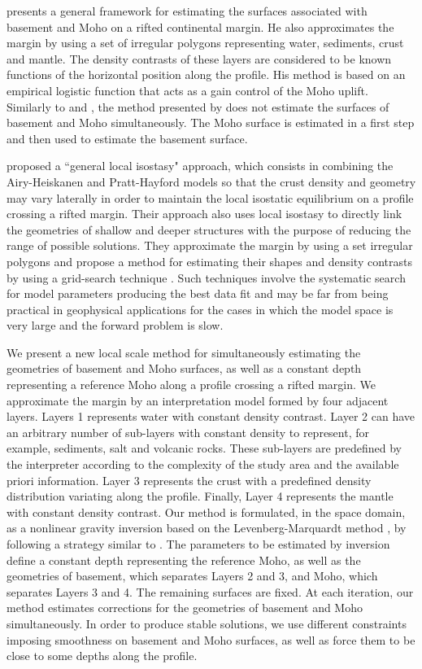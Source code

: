 \documentclass[manuscript]{geophysics}
\begin{document}
\citet{salem2017} presents a general framework for estimating the surfaces associated with
basement and Moho on a rifted continental margin.
He also approximates the margin by using a set of irregular polygons
representing water, sediments, crust and mantle.
The density contrasts of these layers are considered to be known functions
of the horizontal position along the profile.
His method is based on an empirical logistic function that acts as a gain control of the 
Moho uplift.
Similarly to \citet{salem-etal2014} and \citet{garcia-abdeslem2017}, the method presented
by \citet{salem2017} does not estimate the surfaces of basement and Moho simultaneously.
The Moho surface is estimated in a first step and then used to estimate the basement surface.

\citet{ferderer-etal2017} proposed a ``general local isostasy" approach, which consists
in combining the Airy-Heiskanen and Pratt-Hayford models \citep{heiskanen-moritz1967} 
so that the crust density and geometry 
may vary laterally in order to maintain the local isostatic equilibrium on a profile crossing
a rifted margin. Their approach also uses local isostasy to directly link the geometries
of shallow and deeper structures with the purpose of reducing the range of possible solutions.
They approximate the margin by using a set irregular polygons and propose a method 
for estimating their shapes and density contrasts by using a 
grid-search technique \citep{sen-stoffa2013}.
Such techniques involve the systematic search for model parameters producing the best data fit
and may be far from being practical in geophysical applications for the cases in which
the model space is very large and the forward problem is slow.

We present a new local scale method for simultaneously estimating the geometries
of basement and Moho surfaces, as well as a constant depth representing a reference Moho
along a profile crossing a rifted margin.
We approximate the margin by an interpretation model formed by four adjacent layers.
Layers 1 represents water with constant density contrast.
Layer 2 can have an arbitrary number of sub-layers with constant density
to represent, for example, sediments, salt and volcanic rocks.
These sub-layers are predefined by the interpreter according to
the complexity of the study area and the available priori information.
Layer 3 represents the crust with a predefined density distribution
variating along the profile.
Finally, Layer 4 represents the mantle with constant density contrast.
Our method is formulated, in the space domain, as a nonlinear gravity inversion
based on the Levenberg-Marquardt method \citep{silva-etal2001, aster-etal2005}, 
by following a strategy similar to \citet{barbosa-etal1999}.
The parameters to be estimated by inversion define a constant depth representing the
reference Moho, as well as the geometries of 
basement, which separates Layers 2 and 3, and Moho, which separates Layers 3 and 4.
The remaining surfaces are fixed.
At each iteration, our method estimates corrections for the geometries of
basement and Moho simultaneously. 
In order to produce stable solutions,
we use different constraints imposing smoothness on basement and Moho surfaces, 
as well as force them to be close to some depths along the profile. 
\end{document}
